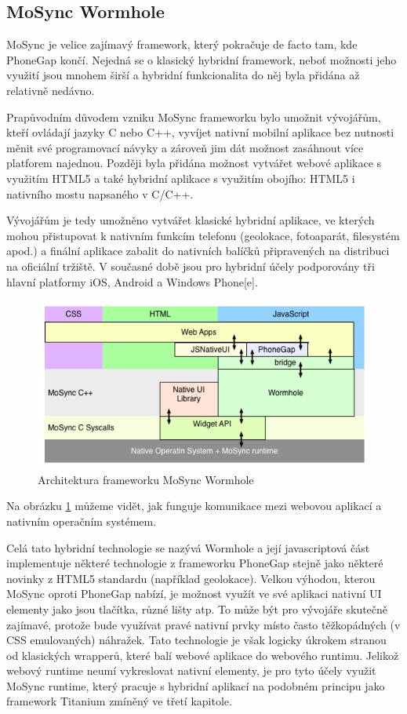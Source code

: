 \subsection{MoSync Wormhole}
MoSync je velice zajímavý framework, který pokračuje de facto tam, kde PhoneGap končí. Nejedná se o klasický hybridní framework, neboť možnosti jeho využití jsou mnohem širší a hybridní funkcionalita do něj byla přidána až relativně nedávno.

Prapůvodním důvodem vzniku MoSync frameworku bylo umožnit vývojářům, kteří ovládají jazyky C nebo C++, vyvíjet nativní mobilní aplikace bez nutnosti měnit své programovací návyky a zároveň jim dát možnost zasáhnout více platforem najednou. Později byla přidána možnost vytvářet webové aplikace s využitím HTML5 a také hybridní aplikace s využitím obojího: HTML5 i nativního mostu napsaného v C/C++.

Vývojářům je tedy umožněno vytvářet klasické hybridní aplikace, ve kterých mohou přistupovat k nativním funkcím telefonu (geolokace, fotoaparát, filesystém apod.) a finální aplikace zabalit do nativních balíčků připravených na distribuci na oficiální tržiště. V současné době jsou pro hybridní účely podporovány tři hlavní platformy iOS, Android a Windows Phone[e].

\begin{figure}\centering
\includegraphics[width=1.0\textwidth]{MoSyncUI_Layers.png}
\caption{Architektura frameworku MoSync Wormhole \cite{javascript_for_native_widgets}}
\label{fig:MoSyncWormholeArchitecture}
\end{figure} 

Na obrázku \ref{fig:MoSyncWormholeArchitecture} můžeme vidět, jak funguje komunikace mezi webovou aplikací a nativním operačním systémem.

Celá tato hybridní technologie se nazývá Wormhole a její javascriptová část implementuje některé technologie z frameworku PhoneGap stejně jako některé novinky z HTML5 standardu (například geolokace). Velkou výhodou, kterou MoSync oproti PhoneGap nabízí, je možnost využít ve své aplikaci nativní UI elementy jako jsou tlačítka, různé lišty atp. To může být pro vývojáře skutečně zajímavé, protože bude využívat pravé nativní prvky místo často těžkopádných (v CSS emulovaných) náhražek. Tato technologie je však logicky úkrokem stranou od klasických wrapperů, které balí webové aplikace do webového runtimu. Jelikož webový runtime neumí vykreslovat nativní elementy, je pro tyto účely využit MoSync runtime, který pracuje s hybridní aplikací na podobném principu jako framework Titanium zmíněný ve třetí kapitole.

